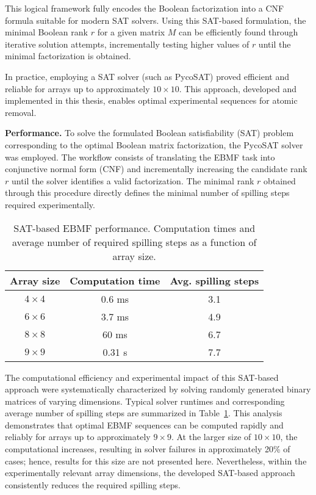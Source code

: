 This logical framework fully encodes the Boolean factorization into a CNF formula suitable for modern SAT solvers. Using this SAT-based formulation, the minimal Boolean rank $r$ for a given matrix $M$ can be efficiently found through iterative solution attempts, incrementally testing higher values of $r$ until the minimal factorization is obtained.

In practice, employing a SAT solver (such as PycoSAT) proved efficient and reliable for arrays up to approximately $10\times 10$. This approach, developed and implemented in this thesis, enables optimal experimental sequences for atomic removal.


\textbf{Performance.} To solve the formulated Boolean satisfiability (SAT) problem corresponding to the optimal Boolean matrix factorization, the PycoSAT solver was employed. The workflow consists of translating the EBMF task into conjunctive normal form (CNF) and incrementally increasing the candidate rank $r$ until the solver identifies a valid factorization. The minimal rank $r$ obtained through this procedure directly defines the minimal number of spilling steps required experimentally.


\begin{table}
\centering
\caption{SAT-based EBMF performance. Computation times and average number of required spilling steps as a function of array size.}
\begin{tabular}{ccc}
\toprule
Array size & Computation time & Avg. spilling steps \\
\midrule
$4\times 4$ & 0.6 ms & 3.1 \\
$6\times 6$ & 3.7 ms & 4.9 \\
$8\times 8$ & 60 ms & 6.7 \\
$9\times 9$ & 0.31 s & 7.7 \\
\bottomrule
\end{tabular}
\label{tab:sat-performance}
\end{table}


The computational efficiency and experimental impact of this SAT-based approach were systematically characterized by solving randomly generated binary matrices of varying dimensions. Typical solver runtimes and corresponding average number of spilling steps are summarized in Table~\ref{tab:sat-performance}. This analysis demonstrates that optimal EBMF sequences can be computed rapidly and reliably for arrays up to approximately $9 \times 9$. At the larger size of $10 \times 10$, the computational increases, resulting in solver failures in approximately 20\% of cases; hence, results for this size are not presented here. Nevertheless, within the experimentally relevant array dimensions, the developed SAT-based approach consistently reduces the required spilling steps.